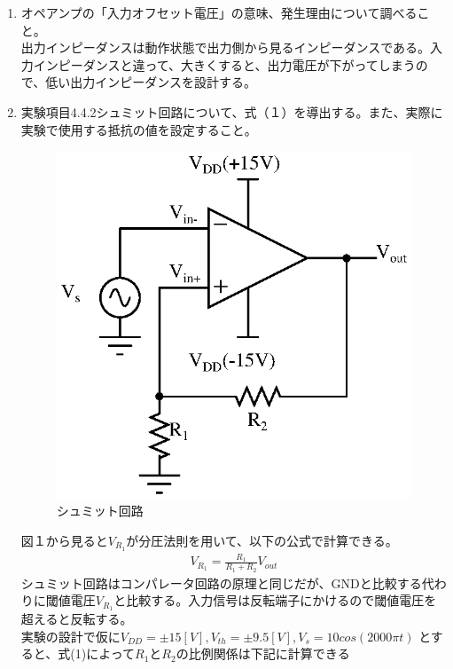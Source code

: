 \documentclass[a4j,dvipdfmx,autodetect-engine]{jsarticle}
\begin{document}
\begin{enumerate}
    
    \item オペアンプの「入力オフセット電圧」の意味、発生理由について調べること。\\
    \quad 出力インピーダンスは動作状態で出力側から見るインピーダンスである。入力インピーダンスと違って、大きくすると、出力電圧が下がってしまうので、低い出力インピーダンスを設計する。
    \item 実験項目4.4.2シュミット回路について、式（１）を導出する。また、実際に実験で使用する抵抗の値を設定すること。\\
    \begin{figure}[H]
        \centering
        \includegraphics[scale = 0.65]{schmitt.eps}
        \caption{シュミット回路}
        \label{fig:my_label}
    \end{figure}
    図１から見ると$V_{R_1}$が分圧法則を用いて、以下の公式で計算できる。
    \begin{eqnarray}
        V_{R_1} = \frac{R_1}{R_1 + R_2} V_{out} 
    \end{eqnarray}
    シュミット回路はコンパレータ回路の原理と同じだが、GNDと比較する代わりに閾値電圧$V_{R_1}$と比較する。入力信号は反転端子にかけるので閾値電圧を超えると反転する。\\
    実験の設計で仮に$V_{DD} = \pm 15[V], V_{th} = \pm 9.5[V], V_{s} = 10cos(2000\pi t)$ とすると、式(1)によって$R_1とR_2の比例関係は下記に計算できる$
    \begin{eqnarray}

\end{eqnarray}
\end{enumerate}
\end{document}
